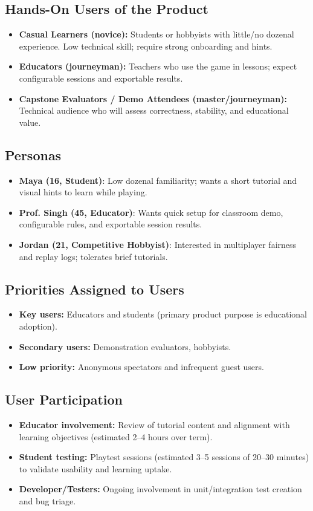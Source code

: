 \documentclass[12pt]{article}
\begin{document}
\subsection{Hands-On Users of the Product}
\begin{itemize}
  \item \textbf{Casual Learners (novice):} Students or hobbyists with little/no dozenal experience. Low technical skill; require strong onboarding and hints.
  \item \textbf{Educators (journeyman):} Teachers who use the game in lessons; expect configurable sessions and exportable results.
  \item \textbf{Capstone Evaluators / Demo Attendees (master/journeyman):} Technical audience who will assess correctness, stability, and educational value.
\end{itemize}

\subsection{Personas}
\begin{itemize}
  \item \textbf{Maya (16, Student)}: Low dozenal familiarity; wants a short tutorial and visual hints to learn while playing.
  \item \textbf{Prof. Singh (45, Educator)}: Wants quick setup for classroom demo, configurable rules, and exportable session results.
  \item \textbf{Jordan (21, Competitive Hobbyist)}: Interested in multiplayer fairness and replay logs; tolerates brief tutorials.
\end{itemize}

\subsection{Priorities Assigned to Users}
\begin{itemize}
  \item \textbf{Key users:} Educators and students (primary product purpose is educational adoption).
  \item \textbf{Secondary users:} Demonstration evaluators, hobbyists.
  \item \textbf{Low priority:} Anonymous spectators and infrequent guest users.
\end{itemize}

\subsection{User Participation}
\begin{itemize}
  \item \textbf{Educator involvement:} Review of tutorial content and alignment with learning objectives (estimated 2--4 hours over term).
  \item \textbf{Student testing:} Playtest sessions (estimated 3--5 sessions of 20--30 minutes) to validate usability and learning uptake.
  \item \textbf{Developer/Testers:} Ongoing involvement in unit/integration test creation and bug triage.
\end{itemize}
\end{document}
